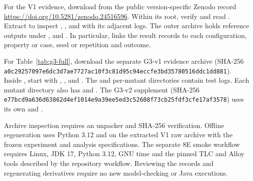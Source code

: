 For the V1 evidence, download 
from the public version-specific Zenodo record
\url{https://doi.org/10.5281/zenodo.24516596}. Within its root, verify
 and
read . Extract 
to inspect , , and
 with its adjacent logs. The outer archive
holds reference outputs under ,
 and . In particular,
 links the result records to each
configuration, property or case, seed or repetition and outcome.

For Table~\ref{tab:g3-full}, download the separate G3-v1 evidence archive
(SHA-256 \nolinkurl{a0c29257097e6dc3d7ae7727ac10f3c81d95c94eccfe3bd35780516ddc1dd881}).
Inside
, start with ,
, and .
The  and per-mutant directories contain test logs. Each
mutant directory also has  and
. The G3-v2 supplement
(SHA-256 \nolinkurl{e77bcd9a636d63862d4ef1014e9a39ee5ed3c52608f73cb25fdf3cfe17af3578})
uses its own
 and .

Archive inspection requires an unpacker and SHA-256 verification. Offline
regeneration uses Python 3.12 and
 on the extracted V1
raw archive with the frozen experiment and analysis specifications.
The separate 8E smoke workflow requires Linux, JDK 17, Python 3.12,
GNU time and the pinned TLC and Alloy tools described by the repository
workflow. Reviewing the records and regenerating derivatives require no
new model-checking or Java executions.
